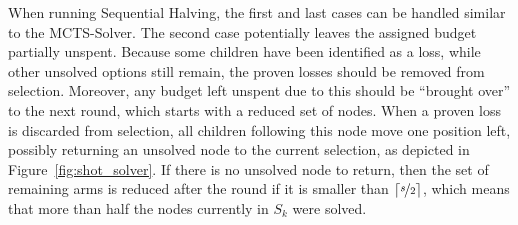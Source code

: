 \documentclass{icga}
\DeclarePairedDelimiter{\ceil}{\lceil}{\rceil}
\begin{document}
When running Sequential Halving, the first and last cases can be handled similar to the MCTS-Solver. The second case potentially leaves the assigned budget partially unspent. Because some children have been identified as a loss, while other unsolved options still remain, the proven losses should be removed from selection. Moreover, any budget left unspent due to this should be ``brought over'' to the next round, which starts with a reduced set of nodes. When a proven loss is discarded from selection, all children following this node move one position left, possibly returning an unsolved node to the current selection, as depicted in Figure~\ref{fig:shot_solver}. If there is no unsolved node to return, then the set of remaining arms is reduced after the round if it is smaller than $\ceil{\nicefrac{s}{2}}$, which means that more than half the nodes currently in $S_k$ were solved.
\end{document}
